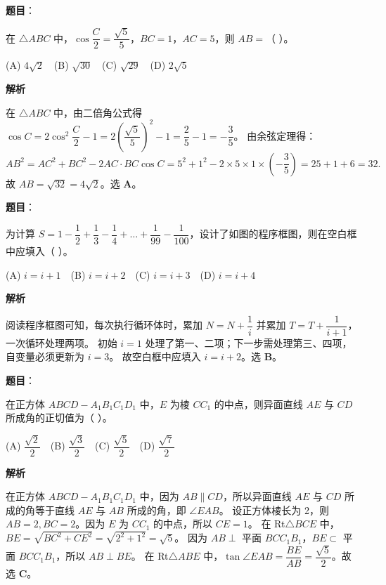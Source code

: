 \begin{answer}

\textbf{题目}：

在 $\triangle ABC$ 中，$\cos\dfrac C2=\dfrac{\sqrt5}{5}$，$BC=1$，$AC=5$，则 $AB=$（ ）。

(A) $4\sqrt2$　(B) $\sqrt{30}$　(C) $\sqrt{29}$　(D) $2\sqrt5$

\textbf{解析}

在 $\triangle ABC$ 中，由二倍角公式得 $\cos C = 2\cos^2\dfrac C2 - 1 = 2\left(\dfrac{\sqrt5}{5}\right)^2 - 1 = \dfrac25 - 1 = -\dfrac35$。
由余弦定理得：
\nopagebreak[4]
\[AB^2 = AC^2 + BC^2 - 2AC\cdot BC\cos C = 5^2 + 1^2 - 2\times 5\times 1\times\left(-\dfrac35\right) = 25 + 1 + 6 = 32.\]
故 $AB = \sqrt{32} = 4\sqrt2$。选 \textbf{A}。


\end{answer}
\begin{answer}

\textbf{题目}：

为计算 $S=1-\dfrac12+\dfrac13-\dfrac14+\dots+\dfrac{1}{99}-\dfrac{1}{100}$，设计了如图的程序框图，则在空白框中应填入（ ）。
\nopagebreak[4]
\begin{center}\end{center}
\nopagebreak[4]
(A) $i=i+1$　(B) $i=i+2$　(C) $i=i+3$　(D) $i=i+4$

\textbf{解析}

阅读程序框图可知，每次执行循环体时，累加 $N = N + \dfrac1i$ 并累加 $T = T + \dfrac{1}{i+1}$，一次循环处理两项。
初始 $i=1$ 处理了第一、二项；下一步需处理第三、四项，自变量必须更新为 $i=3$。
故空白框中应填入 $i=i+2$。选 \textbf{B}。


\end{answer}
\begin{answer}

\textbf{题目}：

在正方体 $ABCD-A_1B_1C_1D_1$ 中，$E$ 为棱 $CC_1$ 的中点，则异面直线 $AE$ 与 $CD$ 所成角的正切值为（ ）。

(A) $\dfrac{\sqrt2}{2}$　(B) $\dfrac{\sqrt3}{2}$　(C) $\dfrac{\sqrt5}{2}$　(D) $\dfrac{\sqrt7}{2}$

\textbf{解析}

在正方体 $ABCD-A_1B_1C_1D_1$ 中，因为 $AB\parallel CD$，所以异面直线 $AE$ 与 $CD$ 所成的角等于直线 $AE$ 与 $AB$ 所成的角，即 $\angle EAB$。
设正方体棱长为 2，则 $AB=2, BC=2$。因为 $E$ 为 $CC_1$ 的中点，所以 $CE=1$。
在 Rt$\triangle BCE$ 中，$BE = \sqrt{BC^2+CE^2} = \sqrt{2^2+1^2} = \sqrt5$。
因为 $AB\perp$ 平面 $BCC_1B_1$，$BE\subset$ 平面 $BCC_1B_1$，所以 $AB\perp BE$。
在 Rt$\triangle ABE$ 中，$\tan\angle EAB = \dfrac{BE}{AB} = \dfrac{\sqrt5}{2}$。故选 \textbf{C}。


\end{answer}
